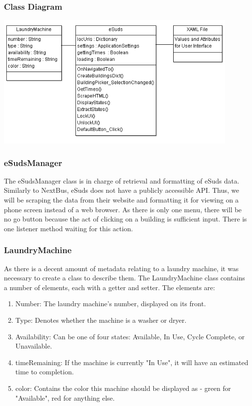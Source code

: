 \documentclass[pdftex,12pt,letter]{article}
\begin{document}
\subsubsection{Class Diagram}
\begin{flushleft}
\includegraphics[width=120mm]{eSuds.png}
\end{flushleft}
\subsubsection{eSudsManager}
The eSudsManager class is in charge of retrieval and formatting of eSuds data. Similarly to NextBus, eSuds does not have a publicly accessible API. Thus, we will be scraping the data from their website and formatting it for viewing on a phone screen instead of a web browser. As there is only one menu, there will be no go button because the act of clicking on a building is sufficient input. There is one listener method waiting for this action.
\subsubsection{LaundryMachine}
As there is a decent amount of metadata relating to a laundry machine, it was necessary to create a class to describe them. The LaundryMachine class contains a number of elements, each with a getter and setter. The elements are:
\begin{enumerate}
\item Number: The laundry machine's number, displayed on its front.
\item Type: Denotes whether the machine is a washer or dryer.
\item Availability: Can be one of four states: Available, In Use, Cycle Complete, or Unavailable.
\item timeRemaining: If the machine is currently "In Use", it will have an estimated time to completion.
\item color: Contains the color this machine should be displayed as - green for "Available", red for anything else.
\end{enumerate}
\end{document}
